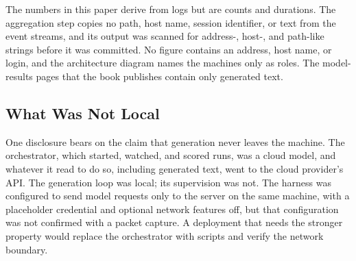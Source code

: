 The numbers in this paper derive from logs but are counts and durations. The aggregation step copies no path, host name, session identifier, or text from the event streams, and its output was scanned for address-, host-, and path-like strings before it was committed. No figure contains an address, host name, or login, and the architecture diagram names the machines only as roles. The model-results pages that the book publishes contain only generated text.

\subsection{What Was Not Local}

One disclosure bears on the claim that generation never leaves the machine. The orchestrator, which started, watched, and scored runs, was a cloud model, and whatever it read to do so, including generated text, went to the cloud provider's API. The generation loop was local; its supervision was not. The harness was configured to send model requests only to the server on the same machine, with a placeholder credential and optional network features off, but that configuration was not confirmed with a packet capture. A deployment that needs the stronger property would replace the orchestrator with scripts and verify the network boundary.
